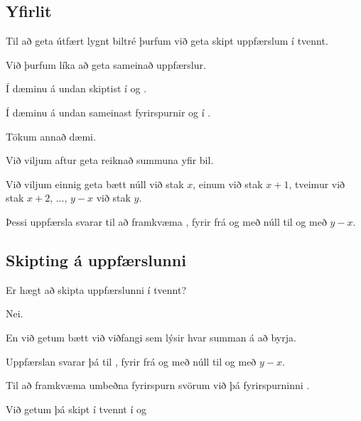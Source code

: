 \subsection{Yfirlit}
{
    {
        \item<1-> Til að geta útfært lygnt biltré þurfum við geta skipt uppfærslum í tvennt.
        \item<2-> Við þurfum líka að geta sameinað uppfærslur.
        \item<3-> Í dæminu á undan skiptist  í  og .
        \item<4-> Í dæminu á undan sameinast fyrirspurnir  og  í .
        \item<5-> Tökum annað dæmi.
        \item<6-> Við viljum aftur geta reiknað summuna yfir bil.
        \item<7-> Við viljum einnig geta bætt núll við stak $x$, einum við stak $x + 1$, tveimur við stak $x + 2$, ..., $y - x$ við stak $y$.
        \item<8-> Þessi uppfærsla svarar til að framkvæma , fyrir  frá og með núll til og með $y - x$.
    }
}

\subsection{Skipting á uppfærslunni}
{
    {
        \item<1-> Er hægt að skipta uppfærslunni  í tvennt?
        \item<2-> Nei.
        \item<3-> En við getum bætt við viðfangi sem lýsir hvar summan á að byrja.
        \item<4-> Uppfærslan  svarar þá til , fyrir  frá og með núll til og með $y - x$.
        \item<5-> Til að framkvæma umbeðna fyrirspurn svörum við þá fyrirspurninni .
        \item<6-> Við getum þá skipt  í tvennt í  og 
    }
}

